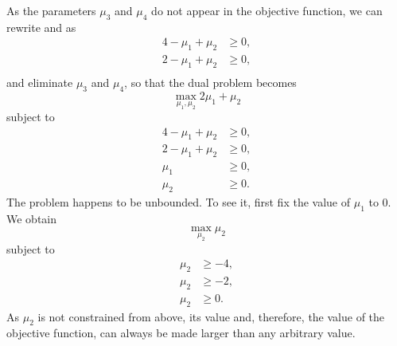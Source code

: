 As the parameters $\mu_3$ and $\mu_4$ do not appear in the objective
function, we 
can rewrite
 and  as
\begin{align*}
  4-\mu_1+\mu_2 & \geq 0,\\
  2-\mu_1+\mu_2 & \geq 0, \\
\end{align*}
and eliminate $\mu_3$ and $\mu_4$, so that the dual problem becomes
\[
\max_{\mu_1,\mu_2}2\mu_1 + \mu_2
\]
subject to
\begin{align*}
  4-\mu_1+\mu_2 & \geq 0,\\
  2-\mu_1+\mu_2 & \geq 0, \\
  \mu_1 & \geq 0, \\
  \mu_2 & \geq 0.
\end{align*}
The problem happens to be unbounded. To see it, first fix the value of $\mu_1$ to
0. We obtain
\[
\max_{\mu_2} \mu_2
\]
subject to
\begin{align*}
  \mu_2 & \geq -4,\\
  \mu_2 & \geq -2, \\
  \mu_2 & \geq 0.
\end{align*}
As $\mu_2$ is not constrained from above, its value and, therefore,
the value of the objective function, can always be made larger than any
arbitrary value. 

